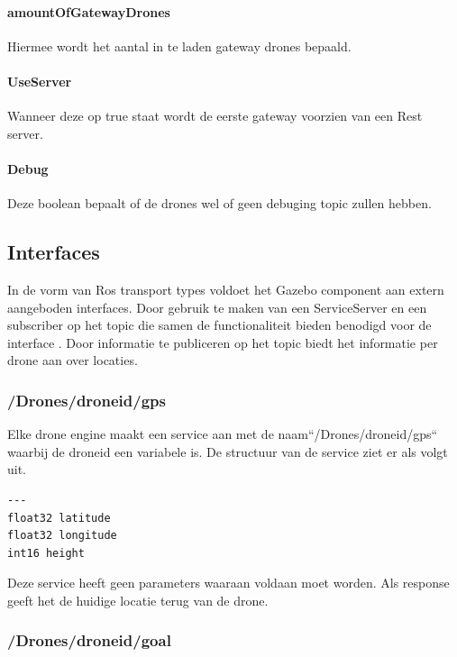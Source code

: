\documentclass[a4paper, 11pt, oneside]{report}
\begin{document}
\paragraph{amountOfGatewayDrones} Hiermee wordt het aantal in te laden gateway drones bepaald.

\paragraph{UseServer} Wanneer deze op true staat wordt de eerste gateway voorzien van een Rest server.

\paragraph{Debug} Deze boolean bepaalt of de drones wel of geen debuging topic zullen hebben.

\subsection{Interfaces}
\label{DetailedDesign:MeshNetwerk:interfaces}
In de vorm van Ros transport types voldoet het Gazebo component aan extern aangeboden interfaces.
Door gebruik te maken van een ServiceServer  en een subscriber op het topic  die samen de functionaliteit bieden benodigd voor de interface . 
Door informatie te publiceren op het topic  biedt het informatie per drone aan over locaties.

\subsubsection{/Drones/drone\textunderscore id/gps}
\label{DetailedDesign:MeshNetwerk:interfaces:requestgps}

Elke drone engine maakt een service aan met de naam``\slash Drones/drone\textunderscore id/gps`` waarbij de drone\textunderscore id een variabele is.
De structuur van de service ziet er als volgt uit.
\begin{lstlisting}
---
float32 latitude
float32 longitude
int16 height
\end{lstlisting}

Deze service heeft geen parameters waaraan voldaan moet worden. 
Als response geeft het de huidige locatie terug van de drone.

\subsubsection{/Drones/drone\textunderscore id/goal}
\label{DetailedDesign:MeshNetwerk:interfaces:location}
\end{document}
